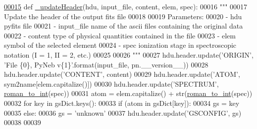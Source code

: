 \begin{DoxyCode}
\hypertarget{namespacepyneb_1_1utils_1_1fits_l00015}{}\hyperlink{namespacepyneb_1_1utils_1_1fits_a2c9c6cf69be4278cdfb529f3a8f3dced}{00015} \textcolor{keyword}{def }\hyperlink{namespacepyneb_1_1utils_1_1fits_a2c9c6cf69be4278cdfb529f3a8f3dced}{\_updateHeader}(hdu, input\_file, content, elem, spec):
00016     \textcolor{stringliteral}{"""}
00017 \textcolor{stringliteral}{    Update the header of the output fits file}
00018 \textcolor{stringliteral}{}
00019 \textcolor{stringliteral}{    Parameters: }
00020 \textcolor{stringliteral}{        - hdu          pyfits file}
00021 \textcolor{stringliteral}{        - input\_file   name of the ascii files containing the original data}
00022 \textcolor{stringliteral}{        - content      type of physical quantities contained in the file}
00023 \textcolor{stringliteral}{        - elem         symbol of the selected element}
00024 \textcolor{stringliteral}{        - spec         ionization stage in spectroscopic notation (I = 1, II = 2, etc.)}
00025 \textcolor{stringliteral}{        }
00026 \textcolor{stringliteral}{    """}
00027     hdu.header.update(\textcolor{stringliteral}{'ORIGIN'}, \textcolor{stringliteral}{'File \{0\}, PyNeb v\{1\}'}.format(input\_file, pn.\_\_version\_\_))
00028     hdu.header.update(\textcolor{stringliteral}{'CONTENT'}, content)
00029     hdu.header.update(\textcolor{stringliteral}{'ATOM'}, sym2name[elem.capitalize()])
00030     hdu.header.update(\textcolor{stringliteral}{'SPECTRUM'}, \hyperlink{namespacepyneb_1_1utils_1_1misc_a97329c3ce57bd870421672b90e3e6541}{roman\_to\_int}(spec))
00031     atom = elem.capitalize() + str(\hyperlink{namespacepyneb_1_1utils_1_1misc_a97329c3ce57bd870421672b90e3e6541}{roman\_to\_int}(spec))
00032     \textcolor{keywordflow}{for} key \textcolor{keywordflow}{in} gsDict.keys():
00033         \textcolor{keywordflow}{if} (atom \textcolor{keywordflow}{in} gsDict[key]):
00034             gs = key
00035         \textcolor{keywordflow}{else}:
00036             gs = \textcolor{stringliteral}{'unknown'}
00037     hdu.header.update(\textcolor{stringliteral}{'GSCONFIG'}, gs)
00038     
00039 
\end{DoxyCode}
\hypertarget{namespacepyneb_1_1utils_1_1fits_a6f08de2b93e2ebc207309560746e9235}{}
